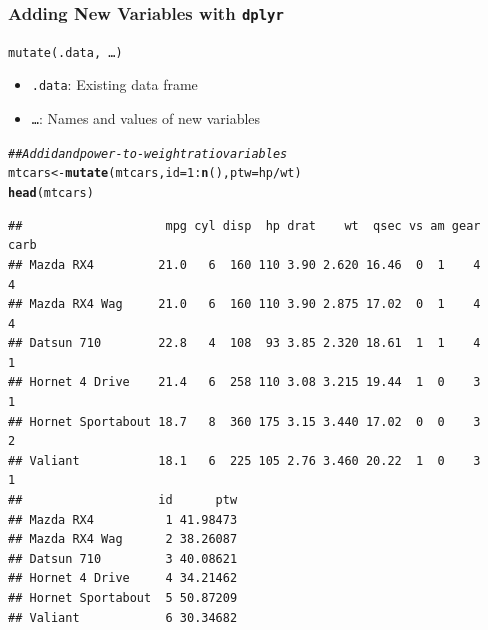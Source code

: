 \documentclass{beamer}\usepackage[]{graphicx}\usepackage[]{xcolor}
\makeatletter
\newcommand{\hlnum}[1]{\textcolor[rgb]{0.686,0.059,0.569}{#1}}%
\newcommand{\hlcom}[1]{\textcolor[rgb]{0.678,0.584,0.686}{\textit{#1}}}%
\newcommand{\hlopt}[1]{\textcolor[rgb]{0,0,0}{#1}}%
\newcommand{\hlstd}[1]{\textcolor[rgb]{0.345,0.345,0.345}{#1}}%
\newcommand{\hlkwb}[1]{\textcolor[rgb]{0.69,0.353,0.396}{#1}}%
\newcommand{\hlkwc}[1]{\textcolor[rgb]{0.333,0.667,0.333}{#1}}%
\newcommand{\hlkwd}[1]{\textcolor[rgb]{0.737,0.353,0.396}{\textbf{#1}}}%
\newenvironment{kframe}{%
 \def\at@end@of@kframe{}%
 \ifinner\ifhmode%
  \def\at@end@of@kframe{\end{minipage}}%
  \begin{minipage}{\columnwidth}%
 \fi\fi%
 \def\FrameCommand##1{\hskip\@totalleftmargin \hskip-\fboxsep
 \colorbox{shadecolor}{##1}\hskip-\fboxsep
     \hskip-\linewidth \hskip-\@totalleftmargin \hskip\columnwidth}%
 \MakeFramed {\advance\hsize-\width
   \@totalleftmargin\z@ \linewidth\hsize
   \@setminipage}}%
 {\par\unskip\endMakeFramed%
 \at@end@of@kframe}
\newenvironment{knitrout}{}{} %
\makeatother
\begin{document}
\begin{frame}[fragile]\frametitle{Adding New Variables with \texttt{dplyr}}
    \texttt{mutate(.data, \ldots)}
    \begin{itemize}
        \item \texttt{.data}: Existing data frame
        \item \texttt{\ldots}: Names and values of new variables
    \end{itemize}
\begin{knitrout}\footnotesize
{}\color{fgcolor}\begin{kframe}
\begin{alltt}
\hlcom{## Add id and power-to-weight ratio variables}
\hlstd{mtcars} \hlkwb{<-} \hlkwd{mutate}\hlstd{(mtcars,} \hlkwc{id} \hlstd{=} \hlnum{1}\hlopt{:}\hlkwd{n}\hlstd{(),} \hlkwc{ptw} \hlstd{= hp} \hlopt{/} \hlstd{wt)}
\hlkwd{head}\hlstd{(mtcars)}
\end{alltt}
\begin{verbatim}
##                    mpg cyl disp  hp drat    wt  qsec vs am gear carb
## Mazda RX4         21.0   6  160 110 3.90 2.620 16.46  0  1    4    4
## Mazda RX4 Wag     21.0   6  160 110 3.90 2.875 17.02  0  1    4    4
## Datsun 710        22.8   4  108  93 3.85 2.320 18.61  1  1    4    1
## Hornet 4 Drive    21.4   6  258 110 3.08 3.215 19.44  1  0    3    1
## Hornet Sportabout 18.7   8  360 175 3.15 3.440 17.02  0  0    3    2
## Valiant           18.1   6  225 105 2.76 3.460 20.22  1  0    3    1
##                   id      ptw
## Mazda RX4          1 41.98473
## Mazda RX4 Wag      2 38.26087
## Datsun 710         3 40.08621
## Hornet 4 Drive     4 34.21462
## Hornet Sportabout  5 50.87209
## Valiant            6 30.34682
\end{verbatim}
\end{kframe}
\end{knitrout}
\end{frame}
\end{document}
